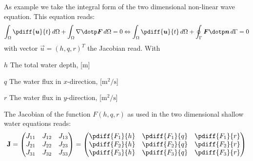 As example we take the integral form of the two dimensional non-linear wave equation.
This equation reads:
%
\begin{align}
    \int_\Omega \pdiff{\vec{u}}{t}\, d\Omega  + \int_\Omega \nabla \dotp \vec{F}\, d\Omega = 0
    \Leftrightarrow
    \int_\Omega \pdiff{\vec{u}}{t}\, d\Omega  + \oint_\Gamma \vec{F} \dotp \vec{n} \, d\Gamma = 0
\end{align}
with vector $\vec{u} = (h, q, r)^T$ the Jacobian read.
With
\begin{symbollist}
    \item[$h$] The total water depth, [$\si{\metre}$]
    \item[$q$] The water flux in $x$-direction, [$\si{\square\metre\per\second}$]
    \item[$r$] The water flux in $y$-direction, [$\si{\square\metre\per\second}$]
\end{symbollist}

The Jacobian of the function $F(h, q, r)$ as used in the two dimensional shallow water equations reads:
\begin{align}
    \mat{J} =
    \begin{pmatrix}
        J_{11} & J_{12} & J_{13} \\
        J_{21} & J_{22} & J_{23} \\
        J_{31} & J_{32} & J_{33}
    \end{pmatrix}
    =
    \begin{pmatrix}
        \pdiff{F_1}{h} & \pdiff{F_1}{q} &  \pdiff{F_1}{r} \\
        \pdiff{F_2}{h} & \pdiff{F_2}{q} &  \pdiff{F_2}{r} \\
        \pdiff{F_3}{h} & \pdiff{F_3}{q} &  \pdiff{F_3}{r}
    \end{pmatrix}
\end{align}


